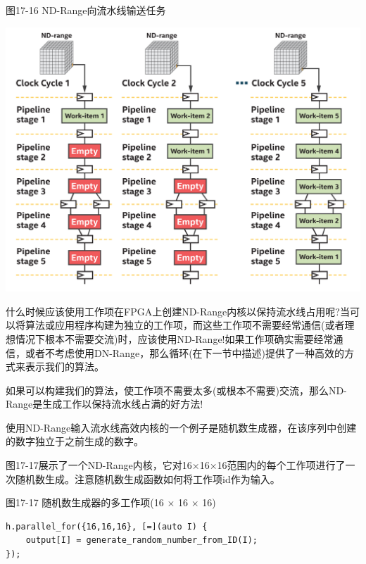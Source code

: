 \hspace*{\fill} \par %
图17-16 ND-Range向流水线输送任务
\begin{center}
	\includegraphics[width=1.0\textwidth]{content/chapter-17/images/15}
\end{center}

什么时候应该使用工作项在FPGA上创建ND-Range内核以保持流水线占用呢?当可以将算法或应用程序构建为独立的工作项，而这些工作项不需要经常通信(或者理想情况下根本不需要交流)时，应该使用ND-Range!如果工作项确实需要经常通信，或者不考虑使用DN-Range，那么循环(在下一节中描述)提供了一种高效的方式来表示我们的算法。\par

\begin{tcolorbox}[colback=red!5!white,colframe=red!75!black]
如果可以构建我们的算法，使工作项不需要太多(或根本不需要)交流，那么ND-Range是生成工作以保持流水线占满的好方法!
\end{tcolorbox}

使用ND-Range输入流水线高效内核的一个例子是随机数生成器，在该序列中创建的数字独立于之前生成的数字。\par

图17-17展示了一个ND-Range内核，它对16×16×16范围内的每个工作项进行了一次随机数生成。注意随机数生成函数如何将工作项id作为输入。\par

\hspace*{\fill} \par %
图17-17 随机数生成器的多工作项(16 × 16 × 16)
\begin{lstlisting}[caption={}]
h.parallel_for({16,16,16}, [=](auto I) {
	output[I] = generate_random_number_from_ID(I);
});
\end{lstlisting}

